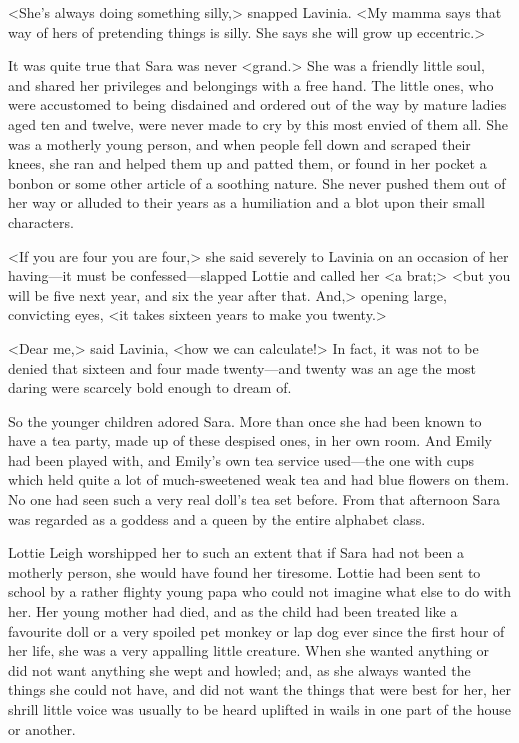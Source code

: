 <She's always doing something silly,> snapped Lavinia. <My mamma says that way of hers of pretending things is silly. She says she will grow up eccentric.>

It was quite true that Sara was never <grand.> She was a friendly little soul, and shared her privileges and belongings with a free hand. The little ones, who were accustomed to being disdained and ordered out of the way by mature ladies aged ten and twelve, were never made to cry by this most envied of them all. She was a motherly young person, and when people fell down and scraped their knees, she ran and helped them up and patted them, or found in her pocket a bonbon or some other article of a soothing nature. She never pushed them out of her way or alluded to their years as a humiliation and a blot upon their small characters.

<If you are four you are four,> she said severely to Lavinia on an occasion of her having—it must be confessed—slapped Lottie and called her <a brat;> <but you will be five next year, and six the year after that. And,> opening large, convicting eyes, <it takes sixteen years to make you twenty.>

<Dear me,> said Lavinia, <how we can calculate!> In fact, it was not to be denied that sixteen and four made twenty—and twenty was an age the most daring were scarcely bold enough to dream of.

So the younger children adored Sara. More than once she had been known to have a tea party, made up of these despised ones, in her own room. And Emily had been played with, and Emily's own tea service used—the one with cups which held quite a lot of much-sweetened weak tea and had blue flowers on them. No one had seen such a very real doll's tea set before. From that afternoon Sara was regarded as a goddess and a queen by the entire alphabet class.

Lottie Leigh worshipped her to such an extent that if Sara had not been a motherly person, she would have found her tiresome. Lottie had been sent to school by a rather flighty young papa who could not imagine what else to do with her. Her young mother had died, and as the child had been treated like a favourite doll or a very spoiled pet monkey or lap dog ever since the first hour of her life, she was a very appalling little creature. When she wanted anything or did not want anything she wept and howled; and, as she always wanted the things she could not have, and did not want the things that were best for her, her shrill little voice was usually to be heard uplifted in wails in one part of the house or another.

